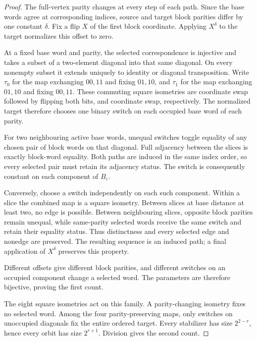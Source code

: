 \documentclass[11pt,a4paper]{article}
\theoremstyle{definition}
\theoremstyle{remark}
\begin{document}
\begin{proof}
The full-vertex parity changes at every step of each path. Since the
base words agree at corresponding indices, source and target block
parities differ by one constant $\delta$. Fix a flip $X$ of the first
block coordinate. Applying $X^\delta$ to the target normalizes this
offset to zero.

At a fixed base word and parity, the selected correspondence is
injective and takes a subset of a two-element diagonal into that
same diagonal. On every nonempty subset it extends uniquely to
identity or diagonal transposition. Write $\tau_0$ for the map
exchanging $00,11$ and fixing $01,10$, and $\tau_1$ for the map
exchanging $01,10$ and fixing $00,11$. These commuting square
isometries are coordinate swap followed by flipping both bits,
and coordinate swap, respectively. The normalized target therefore
chooses one binary switch on each occupied base word of each parity.

For two neighbouring active base words, unequal switches toggle
equality of any chosen pair of block words on that diagonal.
Full adjacency between the slices is exactly block-word equality.
Both paths are induced in the same index order, so every selected
pair must retain its adjacency status. The switch is consequently
constant on each component of $B_\varepsilon$.

Conversely, choose a switch independently on each such component.
Within a slice the combined map is a square isometry. Between
slices at base distance at least two, no edge is possible. Between
neighbouring slices, opposite block parities remain unequal, while
same-parity selected words receive the same switch and retain their
equality status. Thus distinctness and every selected edge and
nonedge are preserved. The resulting sequence is an induced path;
a final application of $X^\delta$ preserves this property.

Different offsets give different block parities, and different
switches on an occupied component change a selected word. The
parameters are therefore bijective, proving the first count.

The eight square isometries act on this family. A parity-changing
isometry fixes no selected word. Among the four parity-preserving
maps, only switches on unoccupied diagonals fix the entire ordered
target. Every stabilizer has size $2^{2-r}$, hence every orbit has
size $2^{r+1}$. Division gives the second count.
\end{proof}
\end{document}
